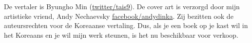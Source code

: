 De vertaler is Byungho Min (\href{http://go.yurichev.com/17344}{twitter/tais9}).
De cover art is verzorgd door mijn artistieke vriend, Andy Nechaevsky
\href{http://go.yurichev.com/17023}{facebook/andydinka}.
Zij bezitten ook de auteursrechten voor de Koreaanse vertaling.
Dus, als je een  boek op je kast wil in het Koreaans en je
wil mijn werk steunen, is het nu beschikbaar voor verkoop.
